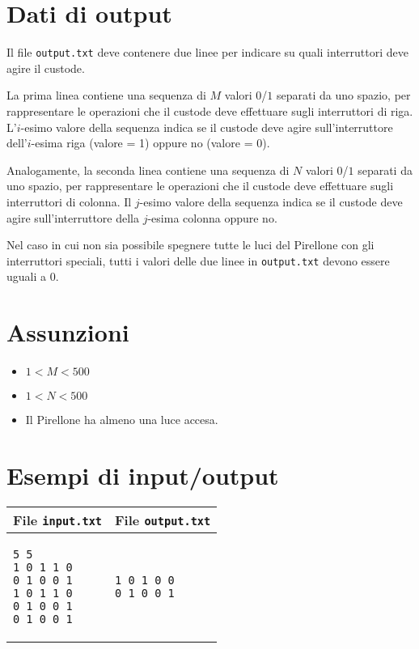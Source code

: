 \documentclass[a4paper,11pt]{article}
\begin{document}
\section*{Dati di output}
  
Il file \texttt{output.txt} deve contenere due linee per indicare
su quali interruttori deve agire il custode.

La prima linea contiene una sequenza di $M$ valori $0$/$1$ separati da uno spazio, per rappresentare le operazioni che il
custode deve effettuare sugli interruttori di riga.
L'$i$-esimo valore della sequenza indica se il custode deve
agire sull'interruttore dell'$i$-esima riga (valore = 1)
oppure no (valore = 0).

Analogamente, la seconda linea contiene una sequenza di $N$
valori  $0$/$1$ separati da uno spazio, per rappresentare le
operazioni che il custode deve effettuare sugli interruttori di
colonna.  Il $j$-esimo valore della sequenza indica se il
custode deve agire sull'interruttore della $j$-esima colonna
oppure no.

Nel caso in cui non sia possibile spegnere tutte le luci del Pirellone
con gli interruttori speciali, tutti i valori delle due linee in
\texttt{output.txt} devono essere uguali a $0$.

  \section*{Assunzioni}
  \begin{itemize}
  
    \item $ 1 < M < 500$
    \item $ 1 < N < 500$
    \item  Il Pirellone ha almeno una luce accesa.
  \end{itemize}

\section*{Esempi di input/output}

  
    \noindent
    \begin{tabular}{p{11cm}|p{5cm}}
    \toprule
    \textbf{File \texttt{input.txt}}
    & \textbf{File \texttt{output.txt}}
    \\
    \midrule
    \scriptsize
    \begin{verbatim}
5 5
1 0 1 1 0
0 1 0 0 1
1 0 1 1 0
0 1 0 0 1
0 1 0 0 1
\end{verbatim}
    &
    \scriptsize
    \begin{verbatim}
1 0 1 0 0
0 1 0 0 1
\end{verbatim}
    \\
    \bottomrule
    \end{tabular}
  
\end{document}
